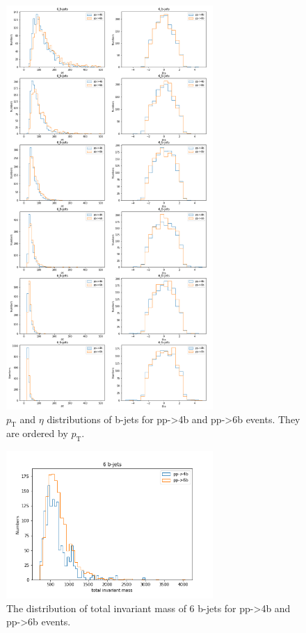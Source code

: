 \documentclass[12pt]{article}
\begin{document}
	\begin{figure}[htpb]
		\centering
		\includegraphics[width=0.7\textwidth]{6_b-jets_PT_Eta_order_by_PT.png}
		\caption{$p_\text{T}$ and $\eta$ distributions of b-jets for pp->4b and pp->6b events. They are ordered by $p_\text{T}$.}
		\label{fig:pt_eta_distribution_of_b_jets}
	\end{figure}
	\begin{figure}[htpb]
		\centering
		\includegraphics[width=0.7\textwidth]{6_b-jets_total_invariant_mass.png}
		\caption{The distribution of total invariant mass of 6 b-jets for pp->4b and pp->6b events.}
		\label{fig:total_invariant_mass_of_b_jets}
	\end{figure}
	
\end{document}
